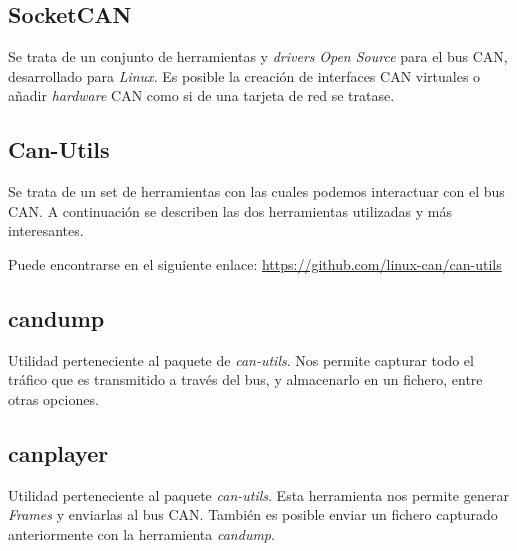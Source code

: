 \subsection{SocketCAN}\label{socketcan}\cite{socket:can}

Se trata de un conjunto de herramientas y \emph{drivers} \emph{Open Source} para el bus CAN, desarrollado para \emph{Linux}. Es posible la creación de interfaces CAN virtuales o añadir \emph{hardware} CAN como si de una tarjeta de red se tratase.


\subsection{Can-Utils}\label{can-utils}

Se trata de un set de herramientas con las cuales podemos interactuar con el bus CAN. A continuación se describen las dos herramientas utilizadas y más interesantes.

Puede encontrarse en el siguiente enlace:
\url{https://github.com/linux-can/can-utils}

\subsection{candump}\label{candump-utils}

Utilidad perteneciente al paquete de \emph{can-utils}. Nos permite capturar todo el tráfico que es transmitido a través del bus, y almacenarlo en un fichero, entre otras opciones.

\subsection{canplayer}\label{canplayer}

Utilidad perteneciente al paquete \emph{can-utils}. Esta herramienta nos permite generar \emph{Frames} y enviarlas al bus CAN. También es posible enviar un fichero capturado anteriormente con la herramienta \emph{candump}.




